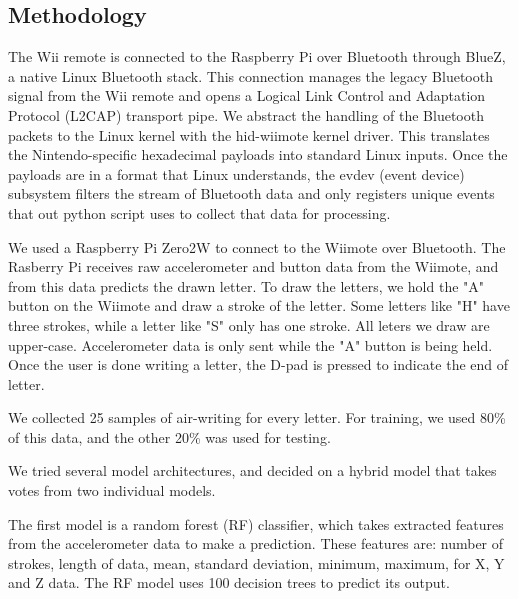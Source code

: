 \documentclass[letterpaper,twocolumn,10pt]{article}
\begin{document}
\subsection*{Methodology}
The Wii remote is connected to the Raspberry Pi over Bluetooth through BlueZ, a native Linux Bluetooth stack. This connection manages the legacy Bluetooth signal from the Wii remote and opens a Logical Link Control and Adaptation Protocol (L2CAP) transport pipe. 
We abstract the handling of the Bluetooth packets to the Linux kernel with the hid-wiimote kernel driver. This translates the Nintendo-specific hexadecimal payloads into standard Linux inputs. Once the payloads are in a format that Linux understands, the evdev (event device) subsystem filters the stream of Bluetooth data and only registers unique events that out python script uses to collect that data for processing. 

We used a Raspberry Pi Zero2W to connect to the Wiimote over Bluetooth. The Rasberry Pi receives raw accelerometer and button data from the Wiimote, and from this data predicts the drawn letter. To draw the letters, we hold the "A" button on the Wiimote and draw a stroke of the letter. Some letters like "H" have three strokes, while a letter like "S" only has one stroke. All leters we draw are upper-case. Accelerometer data is only sent while the "A" button is being held. Once the user is done writing a letter, the D-pad is pressed to indicate the end of letter.

We collected 25 samples of air-writing for every letter. For training, we used 80\% of this data, and the other 20\% was used for testing.

We tried several model architectures, and decided on a hybrid model that takes votes from two individual models. 

The first model is a random forest (RF) classifier, which takes extracted features from the accelerometer data to make a prediction. These features are: number of strokes, length of data, mean, standard deviation, minimum, maximum, for X, Y and Z data. The RF model uses 100 decision trees to predict its output.
\end{document}
